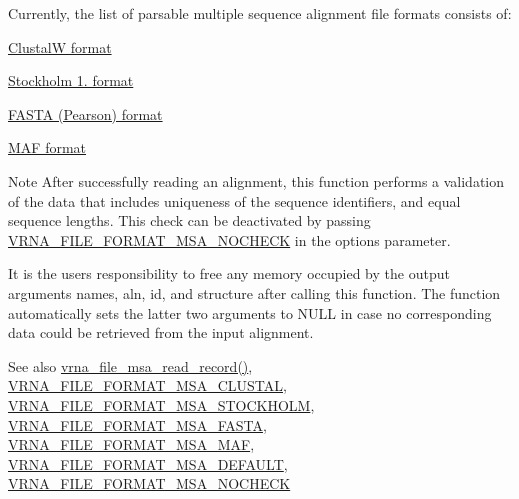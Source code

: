 Currently, the list of parsable multiple sequence alignment file formats consists of\+:
\begin{DoxyItemize}
\item \hyperlink{file_formats_msa-formats-clustal}{ClustalW format}
\item \hyperlink{file_formats_msa-formats-stockholm}{Stockholm 1. format}
\item \hyperlink{file_formats_msa-formats-fasta}{F\+A\+S\+TA (Pearson) format}
\item \hyperlink{file_formats_msa-formats-maf}{M\+AF format}
\end{DoxyItemize}\begin{DoxyNote}{Note}
After successfully reading an alignment, this function performs a validation of the data that includes uniqueness of the sequence identifiers, and equal sequence lengths. This check can be deactivated by passing \hyperlink{group__file__formats__msa_ga229fb3778ecabea4782902b69fa48fd1}{V\+R\+N\+A\+\_\+\+F\+I\+L\+E\+\_\+\+F\+O\+R\+M\+A\+T\+\_\+\+M\+S\+A\+\_\+\+N\+O\+C\+H\+E\+CK} in the {\ttfamily options} parameter.

It is the users responsibility to free any memory occupied by the output arguments {\ttfamily names}, {\ttfamily aln}, {\ttfamily id}, and {\ttfamily structure} after calling this function. The function automatically sets the latter two arguments to {\ttfamily N\+U\+LL} in case no corresponding data could be retrieved from the input alignment.
\end{DoxyNote}
\begin{DoxySeeAlso}{See also}
\hyperlink{group__file__formats__msa_ga59204cd1daa4927f5127cc65a2886efd}{vrna\+\_\+file\+\_\+msa\+\_\+read\+\_\+record()}, \hyperlink{group__file__formats__msa_ga79a23de2c7249f2cccd762e475c81859}{V\+R\+N\+A\+\_\+\+F\+I\+L\+E\+\_\+\+F\+O\+R\+M\+A\+T\+\_\+\+M\+S\+A\+\_\+\+C\+L\+U\+S\+T\+AL}, \hyperlink{group__file__formats__msa_ga62be992445cd8ab2ad7a8fded944338b}{V\+R\+N\+A\+\_\+\+F\+I\+L\+E\+\_\+\+F\+O\+R\+M\+A\+T\+\_\+\+M\+S\+A\+\_\+\+S\+T\+O\+C\+K\+H\+O\+LM}, \hyperlink{group__file__formats__msa_gacf6274a2c825f34e4131404665b00604}{V\+R\+N\+A\+\_\+\+F\+I\+L\+E\+\_\+\+F\+O\+R\+M\+A\+T\+\_\+\+M\+S\+A\+\_\+\+F\+A\+S\+TA}, \hyperlink{group__file__formats__msa_gab3186d774c01570d2a47d0308eec4927}{V\+R\+N\+A\+\_\+\+F\+I\+L\+E\+\_\+\+F\+O\+R\+M\+A\+T\+\_\+\+M\+S\+A\+\_\+\+M\+AF}, \hyperlink{group__file__formats__msa_ga4acc255373831856a8417b68de8a94c0}{V\+R\+N\+A\+\_\+\+F\+I\+L\+E\+\_\+\+F\+O\+R\+M\+A\+T\+\_\+\+M\+S\+A\+\_\+\+D\+E\+F\+A\+U\+LT}, \hyperlink{group__file__formats__msa_ga229fb3778ecabea4782902b69fa48fd1}{V\+R\+N\+A\+\_\+\+F\+I\+L\+E\+\_\+\+F\+O\+R\+M\+A\+T\+\_\+\+M\+S\+A\+\_\+\+N\+O\+C\+H\+E\+CK}
\end{DoxySeeAlso}

